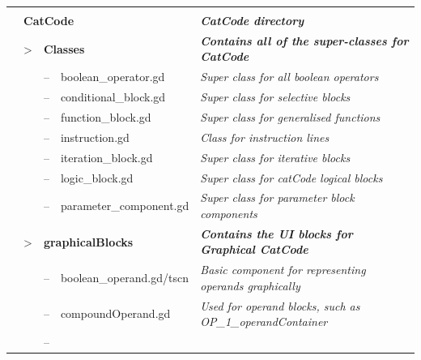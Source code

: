 \begin{fullwidthfigure}[H]
    \centering
    \caption{Back-end file structure of the catCode systems}
    \begin{tabular}{|rllllp{11cm}|}\hline
        & & \multicolumn{3}{l}{} &
        \\
        & \multicolumn{4}{l}{
            \textbf{CatCode}
        }
        & \textit{\textbf{CatCode directory}}
        \\
        & > & \multicolumn{3}{l}{
            \textbf{Classes} 
        }
        & \textit{\textbf{Contains all of the super-classes for CatCode}}
        \\
        & & -- & \multicolumn{2}{l}{
            boolean\_operator.gd 
        }
        & \textit{Super class for all boolean operators}
        \\
        & & -- & \multicolumn{2}{l}{
            conditional\_block.gd 
        }
        & \textit{Super class for selective blocks}
        \\
        & & -- & \multicolumn{2}{l}{
            function\_block.gd 
        }
        & \textit{Super class for generalised functions}
        \\
        & & -- & \multicolumn{2}{l}{
            instruction.gd 
        }
        & \textit{Class for instruction lines}
        \\
        & & -- & \multicolumn{2}{l}{
            iteration\_block.gd 
        }
        & \textit{Super class for iterative blocks}
        \\
        & & -- & \multicolumn{2}{l}{
            logic\_block.gd 
        }
        & \textit{Super class for catCode logical blocks}
        \\
        & & -- & \multicolumn{2}{l}{
            parameter\_component.gd 
        }
        & \textit{Super class for parameter block components}
        \\
        & > & \multicolumn{3}{l}{
            \textbf{graphicalBlocks} 
        }
        & \textit{\textbf{Contains the UI blocks for Graphical CatCode}}
        \\
        & & -- & \multicolumn{2}{l}{
            boolean\_operand.gd/tscn
        }
        & \textit{Basic component for representing operands graphically}
        \\
        & & -- & \multicolumn{2}{l}{
            compoundOperand.gd
        }
        & \textit{Used for operand blocks, such as OP\_1\_operandContainer}
        \\
        & & -- & \multicolumn{2}{l}{
}
\end{tabular}
\end{fullwidthfigure}
